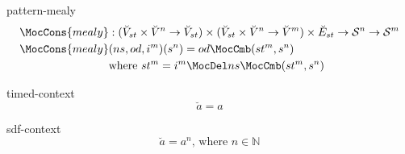 \documentclass[preview]{standalone}
\begin{document}
\begin{docimage}{pattern-mealy}
  \begin{align*}%
    \MocCons{mealy} &:({\breve{V}_{st} \times  \breve{V}^n \rightarrow \breve{V}_{st}})
                      \times ({\breve{V}_{st} \times \breve{V}^n \rightarrow \breve{V}^m})
                      \times \breve{E}_{st}
                      \rightarrow \mathcal{S}^n \rightarrow \mathcal{S}^m \\
    \MocCons{mealy} &(ns,od,i^m)(s^n) = od \MocCmb (st^m, s^n) \\
                    &\text{where}\ st^m = i^m \MocDel ns \MocCmb (st^m, s^n) 
  \end{align*}
\end{docimage}

\begin{docimage}{timed-context}
  \begin{equation*}%
    \breve{a} = a  
  \end{equation*}
\end{docimage} 

\begin{docimage}{sdf-context}
  \begin{equation*}%
    \breve{a} = a^n \text{, where } n \in \mathbb{N} 
  \end{equation*}
\end{docimage} 
\end{document}
